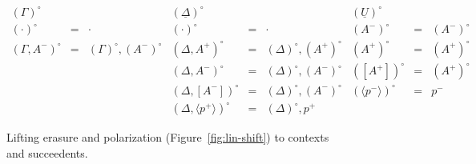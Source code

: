 \begin{figure}
{\small \[
\begin{array}{rcl|rcl|rcl}
{(\Gamma)^\circ} & & &
{(\underline{\Delta})^\circ} & & &
{(\underline{U})^\circ} & & 
\\
(\cdot)^\circ & \!\!\!=\!\!\! & \cdot &
(\cdot)^\circ & \!\!\!=\!\!\! & \cdot &
(A^-)^\circ & \!\!\!=\!\!\! & (A^-)^\circ
\\
(\Gamma, A^-)^\circ & \!\!\!=\!\!\! & (\Gamma)^\circ, (A^-)^\circ &
(\Delta, A^+)^\circ & \!\!\!=\!\!\! & (\Delta)^\circ, (A^+)^\circ &
(A^+)^\circ & \!\!\!=\!\!\! & (A^+)^\circ
\\
& & & 
(\Delta, A^-)^\circ & \!\!\!=\!\!\! & (\Delta)^\circ, (A^-)^\circ &
([A^+])^\circ & \!\!\!=\!\!\! & (A^+)^\circ 
\\
& & &
(\Delta, [ A^- ])^\circ & \!\!\!=\!\!\! & (\Delta)^\circ, (A^-)^\circ & 
(\langle p^- \rangle)^\circ & \!\!\!=\!\!\! & p^-
\\
& & &
(\Delta, \langle p^+ \rangle)^\circ & \!\!\!=\!\!\! & (\Delta)^\circ, p^+ & 
& &
\end{array}\]}
\caption{Lifting erasure and polarization (Figure~\ref{fig:lin-shift}) to
contexts and succeedents.}
\label{fig:lin-shift-ctx}
\end{figure}
